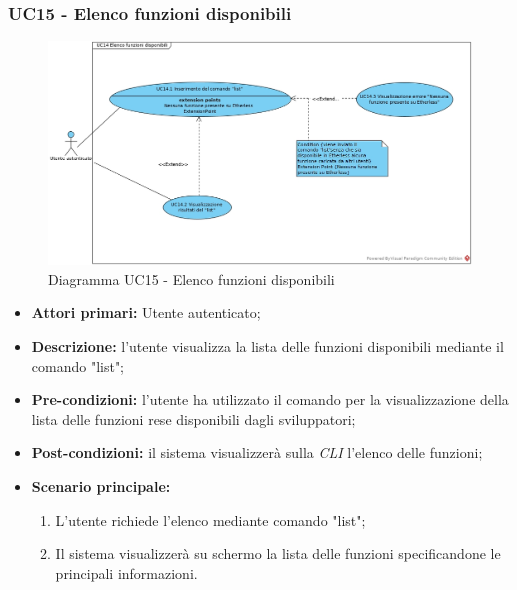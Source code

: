 \subsubsection{UC15 - Elenco funzioni disponibili}
\begin{figure}[h]
	\centering
	\includegraphics[width=\linewidth]{res/img/UC14.jpg}
	\caption{Diagramma UC15 - Elenco funzioni disponibili}
\end{figure}
\begin{itemize}
	\item \textbf{Attori primari:} Utente autenticato;
	\item \textbf{Descrizione:} l'utente visualizza la lista delle funzioni disponibili mediante il comando "list"; 
	\item \textbf{Pre-condizioni:} l'utente ha utilizzato il comando per la visualizzazione della lista delle funzioni rese disponibili dagli sviluppatori;
	\item \textbf{Post-condizioni:} il sistema visualizzerà sulla \textit{CLI\glo} l'elenco delle funzioni;
	\item \textbf{Scenario principale:} 
	\begin{enumerate}
		\item L'utente richiede l'elenco mediante comando "list";
		\item Il sistema visualizzerà su schermo la lista delle funzioni specificandone le principali informazioni.
	\end{enumerate}
\end{itemize}